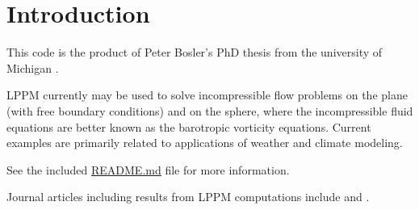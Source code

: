 \hypertarget{index_Introduction}{}\section{Introduction}\label{index_Introduction}
This code is the product of Peter Bosler's Ph\+D thesis from the university of Michigan \cite{BoslerPhD}.

L\+P\+P\+M currently may be used to solve incompressible flow problems on the plane (with free boundary conditions) and on the sphere, where the incompressible fluid equations are better known as the barotropic vorticity equations. Current examples are primarily related to applications of weather and climate modeling.

See the included \hyperlink{README_8md}{R\+E\+A\+D\+M\+E.\+md} file for more information.

Journal articles including results from L\+P\+P\+M computations include \cite{BoslerEtAl2014} and \cite{LauritzenResults}. 
